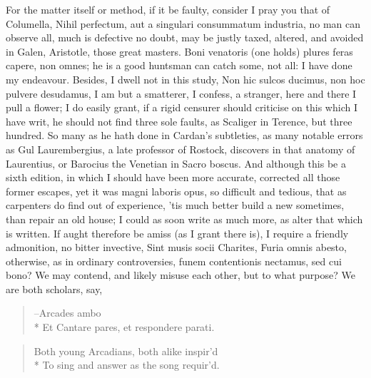 {For the matter itself or method, if it be faulty, consider I pray you
that of Columella, Nihil perfectum, aut a singulari consummatum
industria, no man can observe all, much is defective no doubt, may be
justly taxed, altered, and avoided in Galen, Aristotle, those great
masters. Boni venatoris (one holds) plures feras capere, non
omnes; he is a good huntsman can catch some, not all: I have done my
endeavour. Besides, I dwell not in this study, Non hic sulcos ducimus,
non hoc pulvere desudamus, I am but a smatterer, I confess, a stranger,
here and there I pull a flower; I do easily grant, if a rigid
censurer should criticise on this which I have writ, he should not find
three sole faults, as Scaliger in Terence, but three hundred. So many
as he hath done in Cardan's subtleties, as many notable errors as
Gul Laurembergius, a late professor of Rostock, discovers in that
anatomy of Laurentius, or Barocius the Venetian in Sacro boscus. And
although this be a sixth edition, in which I should have been more
accurate, corrected all those former escapes, yet it was magni laboris
opus, so difficult and tedious, that as carpenters do find out of
experience, 'tis much better build a new sometimes, than repair an old
house; I could as soon write as much more, as alter that which is
written. If aught therefore be amiss (as I grant there is), I require a
friendly admonition, no bitter invective, Sint musis socii
Charites, Furia omnis abesto, otherwise, as in ordinary controversies,
funem contentionis nectamus, sed cui bono? We may contend, and likely
misuse each other, but to what purpose? We are both scholars, say,

\begin{verse}
--\textlatin{Arcades ambo}\\*
\textlatin{Et Cantare pares, et respondere parati.}
\end{verse}

\begin{verse}
Both young Arcadians, both alike inspir'd\\*
To sing and answer as the song requir'd.
\end{verse}

}

